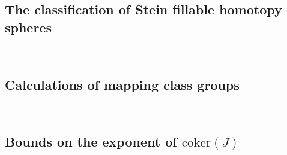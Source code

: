 \subsection{The classification of Stein fillable homotopy spheres}
\ 



\subsection{Calculations of mapping class groups}
\ 



\subsection{Bounds on the exponent of \texorpdfstring{$\mathrm{coker}(J)$}{coker(J)}}
\label{ssec:exp}\ 



